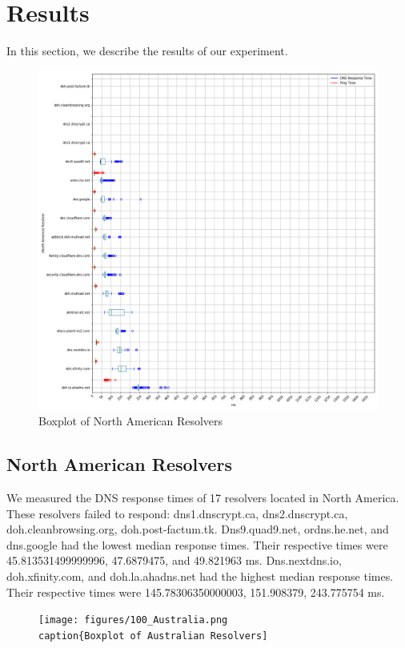\section{Results}\label{sec:results}
In this section, we describe the results of our experiment. 

\begin{figure}[!t]
  \includegraphics[width=\linewidth]{figures/100_North_America.png}
  \caption{Boxplot of North American Resolvers}
  \label{fig:NAPlots}
\end{figure}

\subsection{North American Resolvers}
We measured the DNS response times of 17 resolvers located in North America. 
These resolvers failed to respond: dns1.dnscrypt.ca, dns2.dnscrypt.ca, doh.cleanbrowsing.org, doh.post-factum.tk.
Dns9.quad9.net, ordns.he.net, and dns.google had the lowest median response times.
Their respective times were 45.813531499999996, 47.6879475, and 49.821963 ms. 
Dns.nextdns.io, doh.xfinity.com, and doh.la.ahadns.net had the highest median response times. 
Their respective times were 145.78306350000003, 151.908379, 243.775754 ms. 

\begin{figure}[!t]
  \texttt{[image: figures/100\_Australia.png
  \\caption\{Boxplot of Australian Resolvers]}
  \label{fig:AusPlots}
\end{figure}

